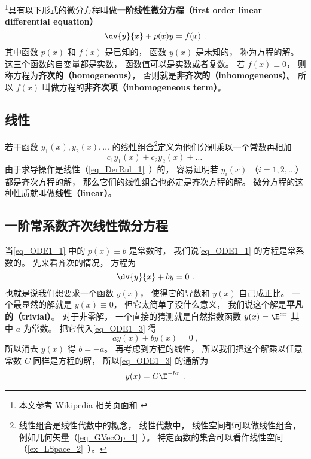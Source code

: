 
\begin{issues}
\issueNeedCite
{}
\end{issues}


\footnote{本文参考 Wikipedia \href{https://en.wikipedia.org/wiki/Ordinary_differential_equation}{相关页面}和 \cite{同济高}}具有以下形式的微分方程叫做\textbf{一阶线性微分方程（first order linear differential equation）}
\begin{equation}\label{eq_ODE1_1}
\dv{y}{x} + p(x)y = f(x)~.
\end{equation}
其中函数 $p(x)$ 和 $f(x)$ 是已知的， 函数 $y(x)$ 是未知的， 称为方程的解。 这三个函数的自变量都是实数， 函数值可以是实数或者复数。 若 $f(x) \equiv 0$， 则称方程为\textbf{齐次的（homogeneous）}， 否则就是\textbf{非齐次的（inhomogeneous）}。 所以 $f(x)$ 叫做方程的\textbf{非齐次项（inhomogeneous term）}。

\subsection{线性}
若干函数 $y_1(x), y_2(x), \dots$ 的线性组合\footnote{线性组合是线性代数中的概念， 线性代数中， 线性空间都可以做线性组合， 例如几何矢量（\autoref{eq_GVecOp_1}~）。 特定函数的集合可以看作线性空间（\autoref{ex_LSpace_2}~）。}定义为他们分别乘以一个常数再相加
\begin{equation}
c_1 y_1(x) + c_2 y_2(x) + \dots~
\end{equation}
由于求导操作是线性（\autoref{eq_DerRul_1}~）的， 容易证明若 $y_i(x)$ （$i = 1, 2,\dots$）都是齐次方程的解， 那么它们的线性组合也必定是齐次方程的解。 微分方程的这种性质就叫做\textbf{线性（linear）}。

\subsection{一阶常系数齐次线性微分方程}
当\autoref{eq_ODE1_1} 中的 $p(x) \equiv b$ 是常数时， 我们说\autoref{eq_ODE1_1} 的方程是常系数的。 先来看齐次的情况， 方程为
\begin{equation}\label{eq_ODE1_3}
\dv{y}{x} + by = 0~.
\end{equation}
也就是说我们想要求一个函数 $y(x)$， 使得它的导数和 $y(x)$ 自己成正比。 一个最显然的解就是 $y(x) \equiv 0$， 但它太简单了没什么意义， 我们说这个解是\textbf{平凡的（trivial）}。 对于非零解， 一个直接的猜测就是自然指数函数 $y(x) = \E^{ax}$ 其中 $a$ 为常数。 把它代入\autoref{eq_ODE1_3} 得
\begin{equation}
ay(x) + by(x) = 0~,
\end{equation}
所以消去 $y(x)$ 得 $b = -a$。 再考虑到方程的线性， 所以我们把这个解乘以任意常数 $C$ 同样是方程的解， 所以\autoref{eq_ODE1_3} 的通解为
\begin{equation}\label{eq_ODE1_5}
y(x) = C\E^{-bx}~.
\end{equation}

